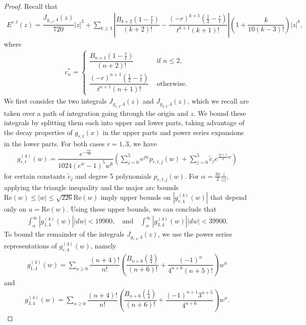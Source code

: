 \documentclass[11pt,reqno]{amsart}
\theoremstyle{definition}
\theoremstyle{plain}
\theoremstyle{named}
\numberwithin{equation}{section}
\theoremstyle{example}
\def\lp{\left(}
\def\rp{\right)}
\begin{document}
\begin{proof}
Recall that
\begin{align*}
	E^{r,t}(z) =  \dfrac{J_{g_{r,t},4}(z)}{720} |z|^3 + \sum_{k \geq 3} \left| \dfrac{B_{k+2}\lp 1 - \frac rt \rp}{(k+2)!} - \dfrac{\lp -r \rp^{k+1} \lp \frac 12 - \frac rt \rp}{t^{k+1} (k+1)!} \right| \lp 1 + \dfrac{k}{10(k-3)!} \rp |z|^k,
\end{align*}
where
\begin{align*}
	c_n^* = \begin{cases} \dfrac{B_{n+1}\lp 1 - \frac rt \rp}{(n+2)!} & \text{ if } n \leq 2, \\ \dfrac{(-r)^{n+1} \lp \frac 12 - \frac rt \rp}{t^{n+1} (n+1)!} & \text{ otherwise}. \end{cases}
\end{align*}
We first consider the two integrals $J_{g_{1,4},4}(z)$ and $J_{g_{3,4},4}(z)$, which we recall are taken over a path of integration going through the origin and $z$. We bound these integrals by splitting them each into upper and lower parts, taking advantage of the decay properties of $g_{r,t}(x)$ in the upper parts and power series expansions in the lower parts. For both cases $r = 1,3$, we have
\begin{align*}
	g^{(4)}_{r,t}(w) = \dfrac{e^{-\frac{rw}{4}}}{1024\lp e^w - 1 \rp^5 w^6} \lp \sum_{j=0}^5 e^{jw} p_{r,t,j}(w) + \sum_{j=0}^5 \tilde{c}_j e^{\frac{4j+r}{4} w} \rp
\end{align*}
for certain constants $\tilde{c}_j$ and degree 5 polynomials $p_{r,t,j}(w)$. For $\alpha = \frac{3\pi}{2} \frac{z}{|z|}$, applying the triangle inequality and the major arc bounds $\mathrm{Re}(w) \leq |w| \leq \sqrt{226}\mathrm{Re}(w)$ imply upper bounds on $\left| g^{(4)}_{r,4}(w) \right|$ that depend only on $u = \mathrm{Re}(w)$. Using these upper bounds, we can conclude that
\begin{align*}
	\int_\alpha^\infty \left| g^{(4)}_{1,4}(w) \right| |dw| < 19900, \ \ \ \text{ and } \ \ \ \int_\alpha^\infty \left| g^{(4)}_{3,4}(w) \right| |dw| < 39900.
\end{align*}
To bound the remainder of the integrals $J_{g_{r,4},4}(z)$, we use the power series representations of $g_{r,4}^{(4)}(w)$, namely
\begin{align*}
	g_{1,4}^{(4)}(w) = \sum_{n \geq 0} \dfrac{(n+4)!}{n!} \lp \dfrac{B_{n+6}\lp \frac 34 \rp}{(n+6)!} + \dfrac{(-1)^n}{4^{n+6} (n+5)!} \rp w^n
\end{align*}
and
\begin{align*}
	g_{3,4}^{(4)}(w) = \sum_{n \geq 0} \dfrac{(n+4)!}{n!} \lp \dfrac{B_{n+6}\lp \frac 14 \rp}{(n+6)!} + \dfrac{(-1)^{n+1} 3^{n+5}}{4^{n+6}} \rp w^n.

\end{align*}
\end{proof}
\end{document}

